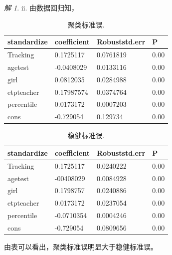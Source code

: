 \documentclass[a4paper]{ctexart}
\theoremstyle{remark}
\newtheorem*{solution}{解}
\begin{document}
\begin{itemize}
\begin{solution}
    ii. 由数据回归知，
    \begin{table}[h]
        \centering
        \begin{threeparttable}%
            \begin{tabular}{llll}%
                \hline
                standardize & coefficient & Robuststd.err & P \\
                \hline
                Tracking &  0.1725117 & 0.0761819  & 0.00 \\
                agetest  &   -0.0408029 & 0.0133116  & 0.00\\
                girl   &  0.0812035  & 0.0284988  & 0.00\\
                etpteacher   &  0.17987574 & 0.0374764    & 0.00\\
                percentile  &  0.0173172 & 0.0007203   & 0.00\\
                cons  &  -0.729054  & 0.129734  & 0.00\\
                \hline
            \end{tabular} 
        \end{threeparttable}
        \caption{\label{font-table} 聚类标准误. }
    \end{table}

    \begin{table}[h]
        \centering
        \begin{threeparttable}%
            \begin{tabular}{llll}%
                \hline
                standardize & coefficient & Robuststd.err & P \\
                \hline
                Tracking &  0.1725117 & 0.0240222  & 0.00 \\
                agetest  &   -00408029 & 0.0084928   & 0.00\\
                girl   &  0.1798757 & 0.0240886  & 0.00\\
                etpteacher   &  0.0173172 & 0.0237054    & 0.00\\
                percentile  &  -0.0710354 & 0.0004246   & 0.00\\
                cons  &  -0.729054  & 0.0809656   & 0.00\\
                \hline
            \end{tabular} 
        \end{threeparttable}
        \caption{\label{font-table} 稳健标准误. }
    \end{table}
    由表可以看出，聚类标准误明显大于稳健标准误。





\end{solution}
\end{itemize}
\end{document}
